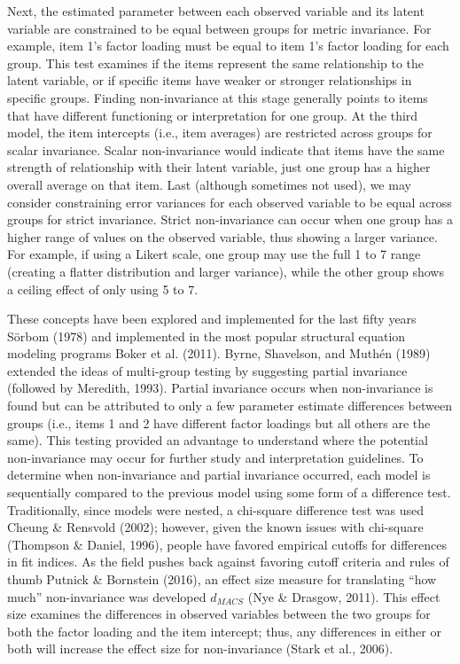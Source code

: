 \documentclass[
  man]{apa6}
\begin{document}
Next, the estimated parameter between each observed variable and its latent variable are constrained to be equal between groups for metric invariance. For example, item 1's factor loading must be equal to item 1's factor loading for each group. This test examines if the items represent the same relationship to the latent variable, or if specific items have weaker or stronger relationships in specific groups. Finding non-invariance at this stage generally points to items that have different functioning or interpretation for one group. At the third model, the item intercepts (i.e., item averages) are restricted across groups for scalar invariance. Scalar non-invariance would indicate that items have the same strength of relationship with their latent variable, just one group has a higher overall average on that item. Last (although sometimes not used), we may consider constraining error variances for each observed variable to be equal across groups for strict invariance. Strict non-invariance can occur when one group has a higher range of values on the observed variable, thus showing a larger variance. For example, if using a Likert scale, one group may use the full 1 to 7 range (creating a flatter distribution and larger variance), while the other group shows a ceiling effect of only using 5 to 7.

These concepts have been explored and implemented for the last fifty years Sörbom (1978) and implemented in the most popular structural equation modeling programs Boker et al. (2011). Byrne, Shavelson, and Muthén (1989) extended the ideas of multi-group testing by suggesting partial invariance (followed by Meredith, 1993). Partial invariance occurs when non-invariance is found but can be attributed to only a few parameter estimate differences between groups (i.e., items 1 and 2 have different factor loadings but all others are the same). This testing provided an advantage to understand where the potential non-invariance may occur for further study and interpretation guidelines. To determine when non-invariance and partial invariance occurred, each model is sequentially compared to the previous model using some form of a difference test. Traditionally, since models were nested, a chi-square difference test was used Cheung \& Rensvold (2002); however, given the known issues with chi-square (Thompson \& Daniel, 1996), people have favored empirical cutoffs for differences in fit indices. As the field pushes back against favoring cutoff criteria and rules of thumb Putnick \& Bornstein (2016), an effect size measure for translating ``how much'' non-invariance was developed \(d_{MACS}\) (Nye \& Drasgow, 2011). This effect size examines the differences in observed variables between the two groups for both the factor loading and the item intercept; thus, any differences in either or both will increase the effect size for non-invariance (Stark et al., 2006).
\end{document}
